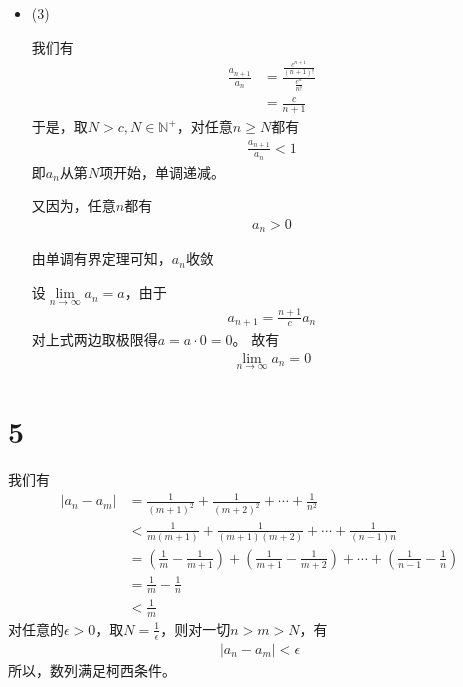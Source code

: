 \documentclass{article}
\begin{document}
\begin{itemize}
  \item (3)

        我们有
        \begin{align*}
          \frac{a_{n + 1}}{a_n}
           & = \frac{\frac{c^{n + 1}}{(n + 1)!}}{\frac{c^n}{n!}} \\
           & = \frac{c}{n + 1}
        \end{align*}
        于是，取$N > c, N \in \mathbb{N}^+$，对任意$n \geq N$都有
        \begin{align*}
          \frac{a_{n + 1}}{a_n} < 1
        \end{align*}
        即$a_n$从第$N$项开始，单调递减。

        又因为，任意$n$都有
        \begin{align*}
          a_n > 0
        \end{align*}

        由单调有界定理可知，${a_n}$收敛

        设$\lim\limits_{n \to \infty} a_n = a$，由于
        \begin{align*}
          a_{n+1} = \frac{n + 1}{c} a_n
        \end{align*}
        对上式两边取极限得$a = a \cdot 0 = 0$。
        故有
        \begin{align*}
          \lim\limits_{n \to \infty} a_n = 0
        \end{align*}
\end{itemize}

\section*{5}

我们有
\begin{align*}
  |a_n - a_m|
   & = \frac{1}{(m + 1)^2} + \frac{1}{(m + 2)^2} + \cdots + \frac{1}{n^2}                                               \\
   & < \frac{1}{m(m + 1)} + \frac{1}{(m + 1)(m + 2)} + \cdots + \frac{1}{(n - 1)n}                                      \\
   & = (\frac{1}{m} - \frac{1}{m + 1}) + (\frac{1}{m + 1} - \frac{1}{m + 2}) + \cdots + (\frac{1}{n - 1} - \frac{1}{n}) \\
   & = \frac{1}{m} - \frac{1}{n}                                                                                        \\
   & < \frac{1}{m}
\end{align*}
对任意的$\epsilon > 0$，取$N = \frac{1}{\epsilon}$，则对一切$n > m > N$，有
\begin{align*}
  |a_n - a_m| < \epsilon
\end{align*}
所以，数列满足柯西条件。
\end{document}
